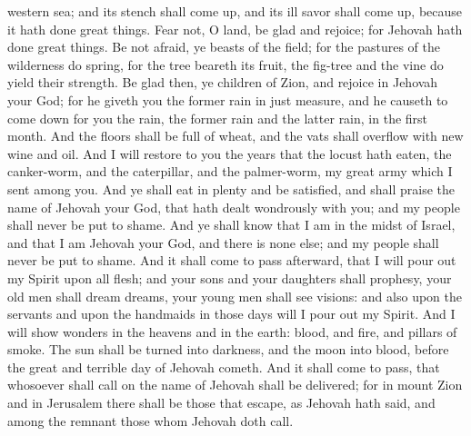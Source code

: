 western sea; and its stench shall come up, and its ill savor shall come up, because it hath done great things.  Fear not, O land, be glad and rejoice; for Jehovah hath done great things. Be not afraid, ye beasts of the field; for the pastures of the wilderness do spring, for the tree beareth its fruit, the fig-tree and the vine do yield their strength. Be glad then, ye children of Zion, and rejoice in Jehovah your God; for he giveth you the former rain in just measure, and he causeth to come down for you the rain, the former rain and the latter rain, in the first month. And the floors shall be full of wheat, and the vats shall overflow with new wine and oil. And I will restore to you the years that the locust hath eaten, the canker-worm, and the caterpillar, and the palmer-worm, my great army which I sent among you. And ye shall eat in plenty and be satisfied, and shall praise the name of Jehovah your God, that hath dealt wondrously with you; and my people shall never be put to shame. And ye shall know that I am in the midst of Israel, and that I am Jehovah your God, and there is none else; and my people shall never be put to shame.  And it shall come to pass afterward, that I will pour out my Spirit upon all flesh; and your sons and your daughters shall prophesy, your old men shall dream dreams, your young men shall see visions: and also upon the servants and upon the handmaids in those days will I pour out my Spirit. And I will show wonders in the heavens and in the earth: blood, and fire, and pillars of smoke. The sun shall be turned into darkness, and the moon into blood, before the great and terrible day of Jehovah cometh. And it shall come to pass, that whosoever shall call on the name of Jehovah shall be delivered; for in mount Zion and in Jerusalem there shall be those that escape, as Jehovah hath said, and among the remnant those whom Jehovah doth call. 

